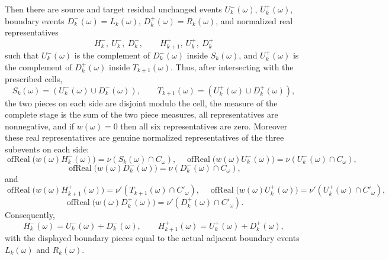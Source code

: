 \begin{helper}
Then there are source and target residual unchanged events
\(U^-_k(\omega)\), \(U^+_k(\omega)\), boundary events
\(D^-_k(\omega)=L_k(\omega)\), \(D^+_k(\omega)=R_k(\omega)\), and normalized
real representatives
\[
H^-_k,\ U^-_k,\ D^-_k,\qquad H^+_{k+1},\ U^+_k,\ D^+_k
\]
such that \(U^-_k(\omega)\) is the complement of \(D^-_k(\omega)\) inside
\(S_k(\omega)\), and \(U^+_k(\omega)\) is the complement of
\(D^+_k(\omega)\) inside \(T_{k+1}(\omega)\).  Thus, after intersecting with
the prescribed cells,
\[
S_k(\omega)=(U^-_k(\omega)\cup D^-_k(\omega)),\qquad
T_{k+1}(\omega)=(U^+_k(\omega)\cup D^+_k(\omega)),
\]
the two pieces on each side are disjoint modulo the cell, the measure of the
complete stage is the sum of the two piece measures, all representatives are
nonnegative, and if \(w(\omega)=0\) then all six representatives are zero.
Moreover these real representatives are genuine normalized representatives of
the three subevents on each side:
\[
\operatorname{ofReal}\!\bigl(w(\omega)H^-_k(\omega)\bigr)
 =\nu(S_k(\omega)\cap C_\omega),\quad
\operatorname{ofReal}\!\bigl(w(\omega)U^-_k(\omega)\bigr)
 =\nu(U^-_k(\omega)\cap C_\omega),
\]
\[
\operatorname{ofReal}\!\bigl(w(\omega)D^-_k(\omega)\bigr)
 =\nu(D^-_k(\omega)\cap C_\omega),
\]
and
\[
\operatorname{ofReal}\!\bigl(w(\omega)H^+_{k+1}(\omega)\bigr)
 =\nu'(T_{k+1}(\omega)\cap C'_\omega),\quad
\operatorname{ofReal}\!\bigl(w(\omega)U^+_k(\omega)\bigr)
 =\nu'(U^+_k(\omega)\cap C'_\omega),
\]
\[
\operatorname{ofReal}\!\bigl(w(\omega)D^+_k(\omega)\bigr)
 =\nu'(D^+_k(\omega)\cap C'_\omega).
\]
Consequently,
\[
H^-_k(\omega)=U^-_k(\omega)+D^-_k(\omega),\qquad
H^+_{k+1}(\omega)=U^+_k(\omega)+D^+_k(\omega),
\]
with the displayed boundary pieces equal to the actual adjacent boundary
events \(L_k(\omega)\) and \(R_k(\omega)\).
\end{helper}
